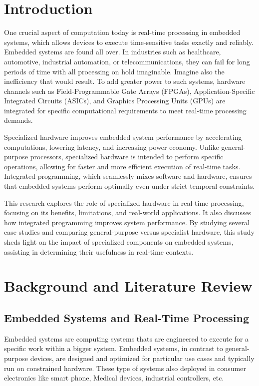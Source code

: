 \documentclass{article}
\begin{document}
\newpage

\tableofcontents
\newpage



\section{Introduction}
One crucial aspect of computation today is real-time processing in embedded systems, which allows devices to execute time-sensitive tasks exactly and reliably. Embedded systems are found all over. In industries such as healthcare, automotive, industrial automation, or telecommunications, they can fail for long periods of time with all processing on hold imaginable. Imagine also the inefficiency that would result. To add greater power to such systems, hardware channels such as Field-Programmable Gate Arrays (FPGAs), Application-Specific Integrated Circuits (ASICs), and Graphics Processing Units (GPUs) are integrated for specific computational requirements to meet real-time processing demands.

Specialized hardware improves embedded system performance by accelerating computations, lowering latency, and increasing power economy. Unlike general-purpose processors, specialized hardware is intended to perform specific operations, allowing for faster and more efficient execution of real-time tasks. Integrated programming, which seamlessly mixes software and hardware, ensures that embedded systems perform optimally even under strict temporal constraints.

This research explores the role of specialized hardware in real-time processing, focusing on its benefits, limitations, and real-world applications. It also discusses how integrated programming improves system performance. By studying several case studies and comparing general-purpose versus specialist hardware, this study sheds light on the impact of specialized components on embedded systems, assisting in determining their usefulness in real-time contexts.

\newpage

\section{Background and Literature Review}
\subsection{Embedded Systems and Real-Time Processing}
Embedded systems are computing systems thats are engineered to execute for a specific
work within a bigger system. Embedded systems, in contrast to general-purpose devices,
are designed and optimized for particular use cases and typically run on constrained
hardware. These type of systems also deployed in consumer electronics like smart phone,
Medical devices, industrial controllers, etc.
\end{document}
